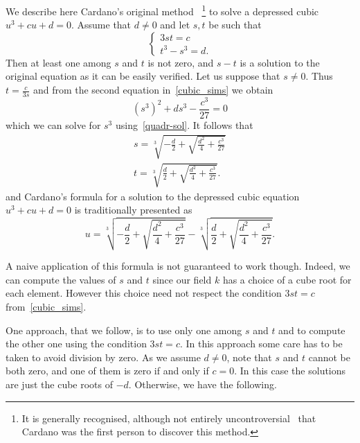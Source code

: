 \documentclass{article} %
\theoremstyle{plain}
\theoremstyle{definition}
\begin{document}
We describe here Cardano's original method~\cite{cardano}%
\footnote{It is generally recognised, although not entirely uncontroversial~\cite{guilbeau_cardano}
  that Cardano was the first person to discover this method.}
to solve a depressed cubic $ u^3 + cu + d = 0 $.
Assume that $d\neq 0$ and let $s,t$ be such that
\begin{equation}\label{cubic_sims}
\begin{cases}
3st = c
\\
t^3 - s^3 = d.
\end{cases}
\end{equation}
Then at least one among $s$ and $t$ is not zero,
and $s - t$ is a solution to the original equation
as it can be easily verified.
Let us suppose that $s \neq 0$.
Thus $t = \frac{c}{3s}$ and
from the second equation in~\eqref{cubic_sims} we obtain
\[
\left(s^3\right)^2 + ds^3 - \frac{c^3}{27} = 0
\]
which we can solve for $s^3$ using~\eqref{quadr-sol}.
It follows that
\begin{gather}
\label{eq:cubic-system-sol1}
s = \sqrt[3]{-\frac{d}{2} + \sqrt{\frac{d^2}{4} + \frac{c^3}{27}}}
\\[1ex]
\label{eq:cubic-system-sol2}
t = \sqrt[3]{\frac{d}{2} + \sqrt{\frac{d^2}{4} + \frac{c^3}{27}}}.
\end{gather}
and Cardano's formula for a solution
to the depressed cubic equation $u^3 + cu + d = 0$ is
traditionally presented as
\begin{equation}\label{eq:depr-cubic-sol}
u = \sqrt[3]{-\frac{d}{2} + \sqrt{\frac{d^2}{4} + \frac{c^3}{27}}}
- \sqrt[3]{\frac{d}{2} + \sqrt{\frac{d^2}{4} + \frac{c^3}{27}}}.
\end{equation}

A naive application of this formula is not guaranteed to work though.
Indeed, we can compute the values of $s$ and $t$
since our field $k$ has a choice of a cube root for each element.
However this choice need not respect the condition $3st=c$
from~\eqref{cubic_sims}.

One approach, that we follow, is to use only one among $s$ and $t$
and to compute the other one using the condition $3st=c$.
In this approach some care has to be taken to avoid division by zero.
As we assume $d \neq 0$, note that $s$ and $t$ cannot be both zero,
and one of them is zero if and only if $c=0$.
In this case the solutions are just the cube roots of $-d$.
Otherwise, we have the following.
\end{document}
